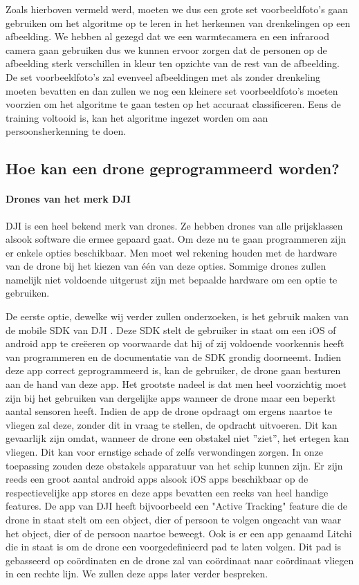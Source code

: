 Zoals hierboven vermeld werd, moeten we dus een grote set voorbeeldfoto's gaan gebruiken om het algoritme op te leren in het herkennen van drenkelingen op een afbeelding. We hebben al gezegd dat we een warmtecamera en een infrarood camera gaan gebruiken dus we kunnen ervoor zorgen dat de personen op de afbeelding sterk verschillen in kleur ten opzichte van de rest van de afbeelding. De set voorbeeldfoto's zal evenveel afbeeldingen met als zonder drenkeling moeten bevatten en dan zullen we nog een kleinere set voorbeeldfoto's moeten voorzien om het algoritme te gaan testen op het accuraat classificeren. Eens de training voltooid is, kan het algoritme ingezet worden om aan persoonsherkenning te doen.

\subsection{Hoe kan een drone geprogrammeerd worden?}

\paragraph{Drones van het merk DJI}

DJI is een heel bekend merk van drones. Ze hebben drones van alle prijsklassen alsook software die ermee gepaard gaat. Om deze nu te gaan programmeren zijn er enkele opties beschikbaar. Men moet wel rekening houden met de hardware van de drone bij het kiezen van één van deze opties. Sommige drones zullen namelijk niet voldoende uitgerust zijn met bepaalde hardware om een optie te gebruiken.

De eerste optie, dewelke wij verder zullen onderzoeken, is het gebruik maken van de mobile SDK van DJI \autocite{MobileSDKDJI}. Deze SDK stelt de gebruiker in staat om een iOS of android app te creëeren op voorwaarde dat hij of zij voldoende voorkennis heeft van programmeren en de documentatie van de SDK grondig doorneemt. Indien deze app correct geprogrammeerd is, kan de gebruiker, de drone gaan besturen aan de hand van deze app. Het grootste nadeel is dat men heel voorzichtig moet zijn bij het gebruiken van dergelijke apps wanneer de drone maar een beperkt aantal sensoren heeft. Indien de app de drone opdraagt om ergens naartoe te vliegen zal deze, zonder dit in vraag te stellen, de opdracht uitvoeren. Dit kan gevaarlijk zijn omdat, wanneer de drone een obstakel niet ''ziet'', het ertegen kan vliegen. Dit kan voor ernstige schade of zelfs verwondingen zorgen. In onze toepassing zouden deze obstakels apparatuur van het schip kunnen zijn. Er zijn reeds een groot aantal android apps alsook iOS apps beschikbaar op de respectievelijke app stores en deze apps bevatten een reeks van heel handige features. De app van DJI \autocite{DJIGo4} heeft bijvoorbeeld een "Active Tracking" feature die de drone in staat stelt om een object, dier of persoon te volgen ongeacht van waar het object, dier of de persoon naartoe beweegt. Ook is er een app genaamd Litchi \autocite{Litchi} die in staat is om de drone een voorgedefinieerd pad te laten volgen. Dit pad is gebasseerd op coördinaten en de drone zal van coördinaat naar coördinaat vliegen in een rechte lijn. We zullen deze apps later verder bespreken.

